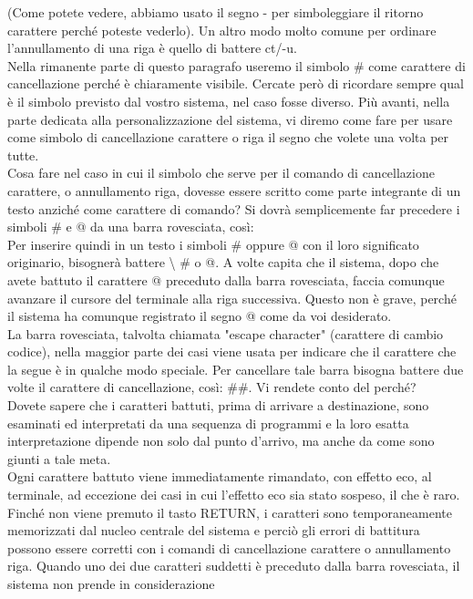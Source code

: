 (Come potete vedere, abbiamo usato il segno - per simboleggiare il ritorno carattere
perché poteste vederlo). Un altro modo molto comune per ordinare l'annullamento
di una riga è quello di battere ct/-u.\\
Nella rimanente parte di questo paragrafo useremo il simbolo \# come carattere di
cancellazione perché è chiaramente visibile. Cercate però di ricordare sempre qual è il
simbolo previsto dal vostro sistema, nel caso fosse diverso. Più avanti, nella parte dedicata 
alla personalizzazione del sistema, vi diremo come fare per usare come simbolo 
di cancellazione carattere o riga il segno che volete una volta per tutte.\\
Cosa fare nel caso in cui il simbolo che serve per il comando di cancellazione carattere,
o annullamento riga, dovesse essere scritto come parte integrante di un testo anziché 
come carattere di comando? Si dovrà semplicemente far precedere i simboli \# e
@ da una barra rovesciata, così:\\
Per inserire quindi in un testo i simboli \# oppure @ con il loro significato originario,
bisognerà battere \textbackslash{} \# o @. A volte capita che il sistema, dopo che avete
battuto il carattere @ preceduto dalla barra rovesciata, faccia comunque avanzare il
cursore del terminale alla riga successiva. Questo non è grave, perché il sistema ha
comunque registrato il segno @ come da voi desiderato.\\
La barra rovesciata, talvolta chiamata "escape character" (carattere di cambio codice),
nella maggior parte dei casi viene usata per indicare che il carattere che la segue
è in qualche modo speciale. Per cancellare tale barra bisogna battere due volte il carattere
di cancellazione, così: \#\#. Vi rendete conto del perché?\\
Dovete sapere che i caratteri battuti, prima di arrivare a destinazione, sono esaminati
ed interpretati da una sequenza di programmi e la loro esatta interpretazione dipende
non solo dal punto d'arrivo, ma anche da come sono giunti a tale meta.\\
Ogni carattere battuto viene immediatamente rimandato, con effetto eco, al terminale,
ad eccezione dei casi in cui l'effetto eco sia stato sospeso, il che è raro. Finché
non viene premuto il tasto RETURN, i caratteri sono temporaneamente memorizzati
dal nucleo centrale del sistema e perciò gli errori di battitura possono essere corretti
con i comandi di cancellazione carattere o annullamento riga. Quando uno dei due
caratteri suddetti è preceduto dalla barra rovesciata, il sistema non prende in considerazione 
